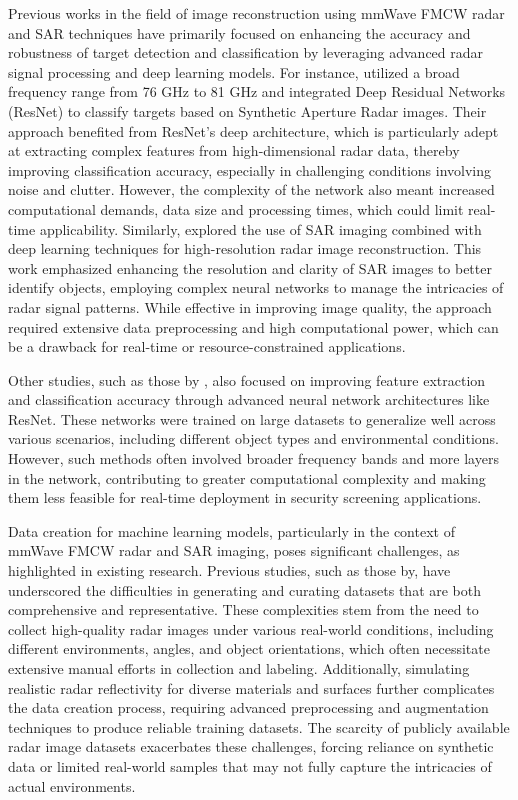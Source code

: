\documentclass[journal,article,submit,pdftex,moreauthors]{Definitions/mdpi}
\begin{document}
Previous works in the field of image reconstruction using mmWave FMCW radar and SAR techniques have primarily focused on enhancing the accuracy and robustness of target detection and classification by leveraging advanced radar signal processing and deep learning models. For instance,\cite{liu2021deep, chen2021image} utilized a broad frequency range from 76 GHz to 81 GHz and integrated Deep Residual Networks (ResNet) to classify targets based on Synthetic Aperture Radar images. Their approach benefited from ResNet's deep architecture, which is particularly adept at extracting complex features from high-dimensional radar data, thereby improving classification accuracy, especially in challenging conditions involving noise and clutter. However, the complexity of the network also meant increased computational demands, data size and processing times, which could limit real-time applicability. Similarly, \cite{gao2020synthetic} explored the use of SAR imaging combined with deep learning techniques for high-resolution radar image reconstruction. This work emphasized enhancing the resolution and clarity of SAR images to better identify objects, employing complex neural networks to manage the intricacies of radar signal patterns. While effective in improving image quality, the approach required extensive data preprocessing and high computational power, which can be a drawback for real-time or resource-constrained applications.

Other studies, such as those by \cite{he2016deep, sun2019machine}, also focused on improving feature extraction and classification accuracy through advanced neural network architectures like ResNet. These networks were trained on large datasets to generalize well across various scenarios, including different object types and environmental conditions. However, such methods often involved broader frequency bands and more layers in the network, contributing to greater computational complexity and making them less feasible for real-time deployment in security screening applications.

Data creation for machine learning models, particularly in the context of mmWave FMCW radar and SAR imaging, poses significant challenges, as highlighted in existing research. Previous studies, such as those by, have underscored the difficulties in generating and curating datasets that are both comprehensive and representative. These complexities stem from the need to collect high-quality radar images under various real-world conditions, including different environments, angles, and object orientations, which often necessitate extensive manual efforts in collection and labeling. Additionally, simulating realistic radar reflectivity for diverse materials and surfaces further complicates the data creation process, requiring advanced preprocessing and augmentation techniques to produce reliable training datasets. The scarcity of publicly available radar image datasets exacerbates these challenges, forcing reliance on synthetic data or limited real-world samples that may not fully capture the intricacies of actual environments.
\end{document}
